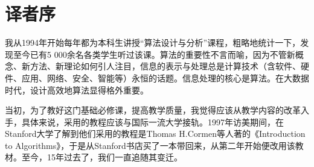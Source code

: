 \chapter{译者序}
我从1994年开始每年都为本科生讲授“算法设计与分析”课程，粗略地统计一下，发现至今已有5 000余名各类学生听过该课。算法的重要性不言而喻，因为不管新概念、新方法、新理论如何引人注目，信息的表示与处理总是计算技术（含软件、硬件、应用、网络、安全、智能等）永恒的话题。信息处理的核心是算法。在大数据时代，设计高效地算法显得格外重要。
\par 当初，为了教好这门基础必修课，提高教学质量，我觉得应该从教学内容的改革入手，具体来说，采用的教程应该与国际一流大学接轨。1997年访美期间，在Stanford大学了解到他们采用的教程是Thomas H.Cormen等人著的《Introduction to Algorithms》，于是从Stanford书店买了一本带回来，从第二年开始便改用该教材。至今，15年过去了，我们一直追随其变迁。